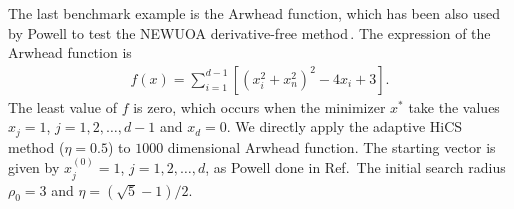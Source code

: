 %
The last benchmark example is the Arwhead function, which has been
also used by Powell to test the NEWUOA derivative-free
method\,\cite{powell2006newuoa}. The expression of the Arwhead function is
\begin{align}
	f(x) = \sum_{i=1}^{d-1}[(x_i^2+x_n^2)^2 - 4 x_i +3].
	\label{}
\end{align}
The least value of $f$ is zero, which occurs when the minimizer
$x^*$ take the values $x_j=1$, $j=1,2,\dots,d-1$ and $x_d=0$. 
We directly apply the adaptive HiCS method ($\eta=0.5$) to $1000$
dimensional Arwhead function.
The starting vector is given by $x_j^{(0)}=1$, $j=1,2,\dots,d$, as
Powell done in Ref.\,\cite{powell2006newuoa}
The initial search radius $\rho_0=3$ and $\eta=(\sqrt{5}-1)/2$.
